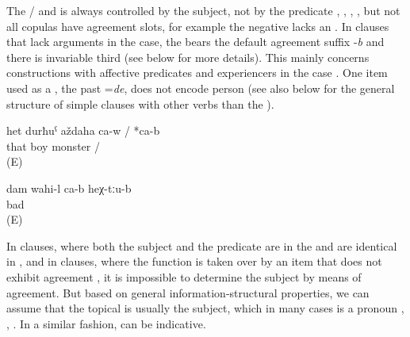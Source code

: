 The / and  is always controlled by the  subject, not by the predicate , ,  ,  , but not all copulas have  agreement slots, for example the negative  lacks an . In  clauses that lack arguments in the  case, the  bears the default agreement suffix -\textit{b} and there is invariable third  (see  below for more details). This mainly concerns  constructions with affective predicates and experiencers in the  case . One item used as a , the past  =\textit{de}, does not encode person  (see also  below for the general structure of simple clauses with other verbs than the ).

\begin{exe}
	\ex	\label{ex:‎‎‎That boy is a monster}
	\gll	het	durħuˁ	aždaha	ca-w	/ *ca-b\\
		that	boy	monster		/ \\
	\glt	{} (E)
	
	\ex	\label{ex:I feel(s) bad there}
	\gll	dam	wahi-l	ca-b	heχ-tːu-b\\
			bad		\\
	\glt	{} (E)	
	
\end{exe}
\largerpage

In  clauses, where both the subject and the predicate are in the  and are identical in  , and in  clauses, where the  function is taken over by an item that does not exhibit agreement , it is impossible to determine the  subject by means of agreement. But based on general information-structural properties, we can assume that the topical  is usually the subject, which in many cases is a pronoun , , . In a similar fashion,  can be indicative. 

